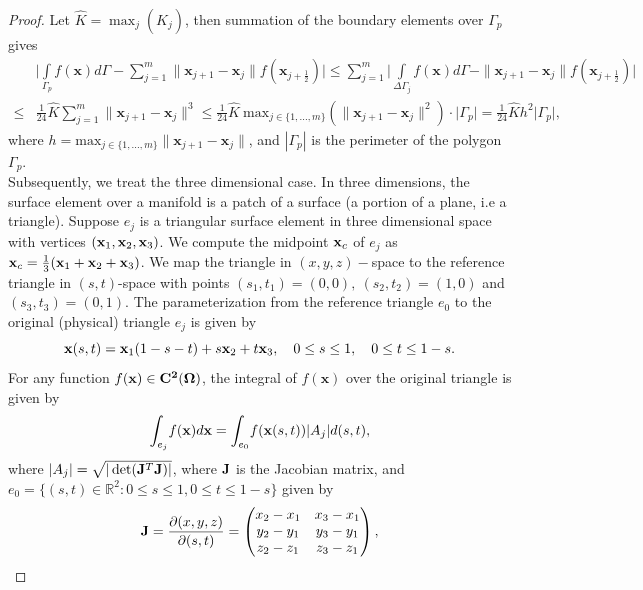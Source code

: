 \documentclass[pdflatex,sn-mathphys-num]{sn-jnl}
\newtheorem*{lemma star}{Lemma}
\begin{document}
\begin{proof}
Let $\hat{K} = \max_j (\hat{K}_j)$, then summation of the boundary elements over ${\Gamma}_p$ gives
\begin{align*}
&\bigg|\int\limits_{\Gamma_p}{f(\mathbf{x})} d\Gamma- \sum_{j=1}^{m} \parallel\mathbf{x}_{j+1} - \mathbf{x}_j\parallel f(\mathbf{x}_{j+\frac12})\bigg| \le 
   \sum_{j=1}^{m}\bigg|\int\limits_{\Delta\Gamma_j}{f(\mathbf{x})} d\Gamma-\parallel\mathbf{x}_{j+1} - \mathbf{x}_j\parallel f(\mathbf{x}_{j+\frac12})\bigg|  \\
  \leq&\frac{1}{24} \hat{K} \sum_{j=1}^{m}\parallel\mathbf{x}_{j+1} - \mathbf{x}_j\parallel^3
   \leq \frac{1}{24}\hat{K}\ \text{max}_{j\in{\{1,...,m}\}} (\parallel\mathbf{x}_{j+1} - \mathbf{x}_j\parallel^2)\cdot \big|\Gamma_p\big| 
   =\frac{1}{24}\hat{K}h^2\big|\Gamma_p\big|,
\end{align*}
where $h=\text{max}_{j\in{\{1,...,m}\}}\parallel\mathbf{x}_{j+1} - \mathbf{x}_j\parallel$, and $|{\Gamma }_p|$ is the perimeter of the polygon ${\Gamma }_p$. 
\\[2ex]
Subsequently, we treat the three dimensional case. In three dimensions, the surface element over a manifold is a patch of a surface (a portion of a plane, i.e a triangle). Suppose $e_j$ is a triangular surface element in three dimensional space with vertices $({\bf{x}}_1, {\bf{x}}_2, {\bf{x}}_3)$. We compute the midpoint ${\bf{x}}_c$ of $e_j$ as ${\bf{x}}_c= \frac{1}{3} ({\bf{x}}_1 + {\bf{x}}_2 + {\bf{x}}_3)$.  We map the triangle in $(x, y,z)-$space to the reference triangle in $(s, t)$-space with points $(s_1,t_1)=(0, 0), ~(s_2,t_2)=(1, 0)$ and $(s_3,t_3)=(0, 1)$. The parameterization from the reference triangle $e_0$ to the original (physical) triangle $e_j$ is given by
\begin{equation*}
    {\bf{x}}(s, t) = {\bf{x}}_1(1 - s - t) + s{\bf{x}}_2 + t {\bf{x}}_3, \quad 0 \leq s \leq 1, \quad 0 \leq t \leq 1-s.
\end{equation*}
For any function $f({\mathbf{x}}) \in {\bf{C}^2(\Omega)}$, the integral of $f(\mathbf{x})$ over the original triangle is given by
\begin{equation*}
    {\int_{e_j}} f({\bf{x}})d{{\bf{x}}} = {\int_{e_0}} f({\bf{x}}(s, t)) |A_j| d(s, t),
\end{equation*}
where $|A_j|=\sqrt{| \det({\bf{J}}^T {\bf{J}})|}$, where $\bf{J}$ is the Jacobian matrix, and $e_0 = \{(s, t) \in \mathbb{R}^2 : 0 \leq s \leq 1, 0 \leq t \leq 1 - s\}$ given by
\begin{equation*}
   {\bf{J}} = \frac{\partial(x, y,z)}{\partial(s, t)} = \begin{pmatrix} x_2 - x_1 & x_3 - x_1 \\ y_2 - y_1 & y_3 - y_1 \\ z_2 - z_1 & z_3 - z_1 \end{pmatrix},

\end{equation*}
\end{proof}
\end{document}
